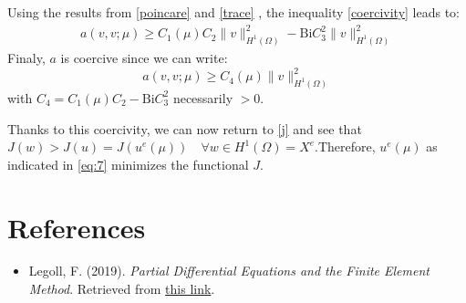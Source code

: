 \documentclass[
	english,
	11pt, %
]{fphw}
\newcommand{\bi}{\text{Bi}}
\begin{document}
\noindent Using the results from \eqref{poincare} and \eqref{trace} , the inequality \eqref{coercivity} leads to:
\begin{align*}
	a(v,v;\mu) \geq C_1(\mu) C_2 \lVert v \rVert_{H^1(\Omega)}^2 - \bi C_3^2 \lVert v \rVert_{H^1(\Omega)}^2
\end{align*}
Finaly, $a$ is coercive since we can write:
$$
a(v,v;\mu) \geq C_4(\mu) \lVert v \rVert_{H^1(\Omega)}^2
$$
with $C_4 = C_1(\mu)C_2-\bi C_3^2$ necessarily $> 0$.

Thanks to this coercivity, we can now return to \cref{j} and see that $J(w) > J(u) = J(u^e(\mu)) \quad \forall w \in H^1(\Omega) = X^e$.Therefore, $u^e(\mu)$ as indicated in \eqref{eq:7} minimizes the functional $J$.





\section*{References}
\begin{itemize}
	\item Legoll, F. (2019). \textit{Partial Differential Equations and the Finite Element Method}. Retrieved from \href{http://cermics.enpc.fr/~legoll/poly_EDP-EF_jan19.pdf}{this link}.
\end{itemize}
\end{document}
